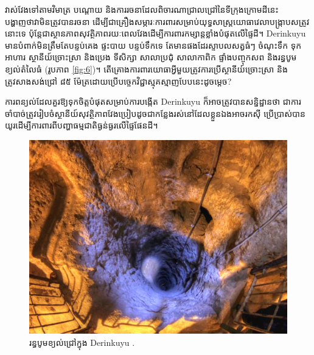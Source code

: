 \documentclass[10pt,twocolumn,letterpaper]{article}
\begin{document}
វាស់វែងទៅតាមវិមាត្រ បណ្តោយ និងការរចនាដែលពិចារណាជ្រាលជ្រៅនៃទីក្រុងក្រោមដីនេះបង្ហាញថាវាមិនត្រូវបានរចនា ដើម្បីជាគ្រឿងសម្ភារៈការពារសម្រាប់យុទ្ធសាស្រ្តយោធាវេលាបង្រ្កាបសត្រូវនោះទេ ប៉ុន្តែជាស្ថានភាពសុវត្ថិភាពរយៈពេលវែងដើម្បីការពារកម្សាន្តខ្លាំងបំផុតលើផ្ទៃដី។ Derinkuyu មានបំពាក់មិនត្រឹមតែបន្ទប់គេង ផ្ទះបាយ បន្ទប់ទឹកទេ តែមានផងដែរស្ទាបលសត្វធំៗ ចំណុះទឹក ទុកអាហារ ស្ថានីយ៍ច្រោះស្រា និងប្រេង ទីសិក្សា សាលាប្រជុំ សាលាកាពិក ផ្ទាំងបញ្ចុកសព និងរន្ធបូមខ្យល់តំលៃធំ (រូបភាព \ref{fig:6})។ តើគ្រោងការពារយោធាអ្វីមួយត្រូវការប្រើស្ថានីយ៍ច្រោះស្រា និងត្រូវសាងសង់ជ្រៅ ៨៥ ម៉ែត្រដោយប្រើបច្ចេកវិជ្ជាស្មុគស្មាញបែបនេះដូចម្តេច?

ការពន្យល់ដែលគួរឱ្យទុកចិត្តបំផុតសម្រាប់ការបង្កើត Derinkuyu ក៏អាចត្រូវបានសន្និដ្ឋានថា ជាការចាំបាច់ត្រូវរៀបចំស្ថានីយ៍សុវត្ថិភាពវែងប្រៀបដូចជាកន្លែងរស់នៅដែលខ្លួនឯងអាចរកស៊ី ប្រើប្រាស់បានយូរដើម្បីការពារពីបញ្ហាធម្មជាតិធ្ងន់ធ្ងរលើផ្ទៃផែនដី។

\begin{figure}[t]
\begin{center}
   \includegraphics[width=1\linewidth]{derinkuyu-air.jpg}
\end{center}
   \caption{រន្ធបូមខ្យល់ជ្រៅក្នុង Derinkuyu \cite{53}.}
\label{fig:6}
\label{fig:onecol}
\end{figure}


\end{document}
